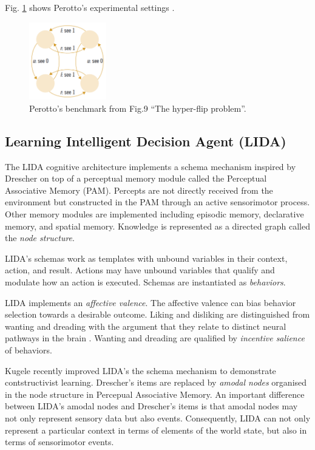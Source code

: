 \documentclass[runningheads]{llncs}
\begin{document}
Fig. \ref{fig:perotto_ben} shows Perotto's experimental settings \cite{Perotto:2013:CF}.

\begin{figure}
	\centering
	\includegraphics[width=0.3\textwidth]{Figure_perotto_benchmark.png}
	\caption{Perotto's benchmark from \cite{Perotto:2013:CF} Fig.9 ``The hyper-flip problem''.} 
	\label{fig:perotto_ben}
\end{figure}




\subsection{Learning Intelligent Decision Agent (LIDA)}
\label{sec:lida}

The LIDA cognitive architecture \cite{kugele_learning_2021}  implements a schema mechanism inspired by Drescher on top of a perceptual memory module called the Perceptual Associative Memory (PAM). 
Percepts are not directly received from the environment but constructed in the PAM through an active sensorimotor process. 
Other memory modules are implemented including episodic memory, declarative memory, and spatial memory.
Knowledge is represented as a directed graph called the \textit{node structure}. 

LIDA's schemas work as templates with unbound variables in their context, action, and result. 
Actions may have  unbound variables that qualify and modulate how an action is executed. 
Schemas are instantiated as \textit{behaviors}. 

LIDA implements an \textit{affective valence}. 
The affective valence can bias behavior selection towards a desirable outcome. 
Liking and disliking are distinguished from wanting and dreading with the argument that they relate to distinct neural pathways in the brain \cite{kringelbach_functional_2010}. 
Wanting and dreading are qualified by \textit{incentive salience} of behaviors.   

Kugele \cite{kugele2025_constructivist} recently improved LIDA's the schema mechanism to demonstrate contstructivist learning.
Drescher's items are replaced by \textit{amodal nodes} organised in the node structure in Percepual Associative Memory. 
An important difference between LIDA's amodal nodes and Drescher's items is that amodal nodes may not only represent sensory data but also events. 
Consequently, LIDA can not only represent a particular context in terms of elements of the world state, but also in terms of sensorimotor events. 
\end{document}
